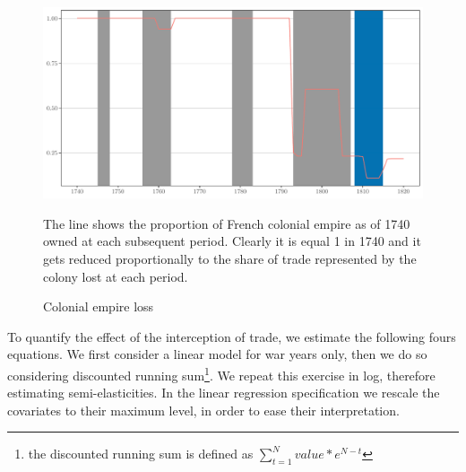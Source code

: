 \documentclass[12pt,a4paper,notitlepage,english]{article}
\newcommand{\fontsmall}{\fontsize{10pt}{12pt}\selectfont}
\begin{document}
\begin{figure}[h!]
	\caption{Colonial empire loss}
	\label{colony_loss}
	\centering
	\includegraphics[scale=.6]{colony_loss}
	\begin{minipage}{18cm}
		\begin{flushleft}
			\fontsmall 
			The line shows the proportion of French colonial empire as of 1740 owned at each subsequent period. Clearly it is equal 1 in 1740 and it gets reduced proportionally to the share of trade represented by the colony lost at each period.
		\end{flushleft}
	\end{minipage}
\end{figure}


To quantify the effect of the interception of trade, we estimate the following fours equations.
We first consider a linear model for war years only, then we do so considering discounted running sum\footnote{the discounted running sum is defined as $\sum_{t=1}^N value*e^{N-t}$}. We repeat this exercise in log, therefore estimating semi-elasticities. 
In the linear regression specification we rescale the covariates to their maximum level, in order to ease their interpretation. 

\end{document}
